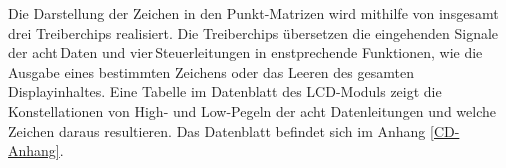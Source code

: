 Die Darstellung der Zeichen in den Punkt-Matrizen wird mithilfe von insgesamt drei Treiberchips realisiert. Die Treiberchips übersetzen die eingehenden Signale der acht\,Daten und  vier\,Steuerleitungen in enstprechende Funktionen, wie die Ausgabe eines bestimmten Zeichens oder das Leeren des gesamten Displayinhaltes. Eine Tabelle im Datenblatt des LCD-Moduls zeigt die Konstellationen von High- und Low-Pegeln der acht Datenleitungen und welche Zeichen daraus resultieren. Das Datenblatt befindet sich im Anhang \ref{CD-Anhang}.
